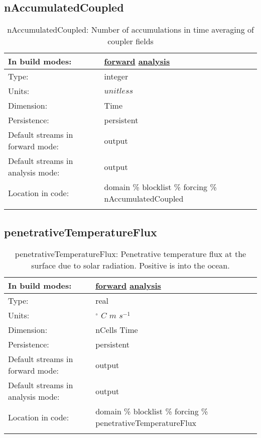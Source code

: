 \subsection[nAccumulatedCoupled]{nAccumulatedCoupled}
\label{subsec:var_sec_forcing_nAccumulatedCoupled}
\begin{center}
\begin{longtable}{| p{2.0in} | p{4.0in} |}
        \hline 
        In build modes: & \hyperref[subsec:forward_var_tab_forcing]{forward} \hyperref[subsec:analysis_var_tab_forcing]{analysis} \\
        \hline 
        Type: & integer \\
        \hline 
        Units: & $unitless$ \\
        \hline 
        Dimension: & Time \\
        \hline 
        Persistence: & persistent \\
        \hline 
		 Default streams in forward mode: &  output \\
        \hline 
		 Default streams in analysis mode: &  output \\
        \hline 
		 Location in code: & domain \% blocklist \% forcing \% nAccumulatedCoupled \\
		 \hline 
    \caption{nAccumulatedCoupled: Number of accumulations in time averaging of coupler fields}
\end{longtable}
\end{center}
\subsection[penetrativeTemperatureFlux]{penetrativeTemperatureFlux}
\label{subsec:var_sec_forcing_penetrativeTemperatureFlux}
\begin{center}
\begin{longtable}{| p{2.0in} | p{4.0in} |}
        \hline 
        In build modes: & \hyperref[subsec:forward_var_tab_forcing]{forward} \hyperref[subsec:analysis_var_tab_forcing]{analysis} \\
        \hline 
        Type: & real \\
        \hline 
        Units: & $^\circ$ $C$ $m$ $s^{-1}$ \\
        \hline 
        Dimension: & nCells Time \\
        \hline 
        Persistence: & persistent \\
        \hline 
		 Default streams in forward mode: &  output \\
        \hline 
		 Default streams in analysis mode: &  output \\
        \hline 
		 Location in code: & domain \% blocklist \% forcing \% penetrativeTemperatureFlux \\
		 \hline 
    \caption{penetrativeTemperatureFlux: Penetrative temperature flux at the surface due to solar radiation. Positive is into the ocean.}
\end{longtable}
\end{center}
